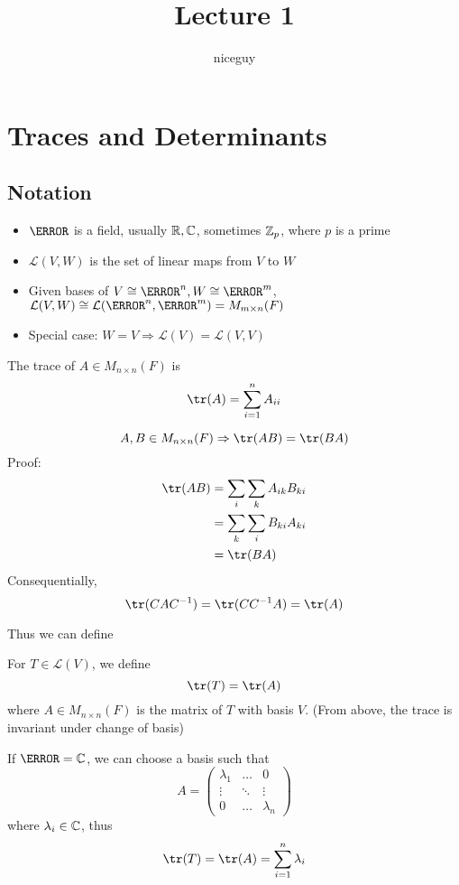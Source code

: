 \documentclass[12pt]{article}
\author{niceguy}
\title{Lecture 1}
\begin{document}
\maketitle

\section{Traces and Determinants}

\subsection{Notation}

\begin{itemize}
	\item $\F$ is a field, usually $\mathbb{R}, \mathbb{C}$, sometimes $\mathbb{Z}_p$, where $p$ is a prime
	\item $\mathcal{L}(V,W)$ is the set of linear maps from $V$ to $W$
	\item Given bases of $V \cong \F^n, W \cong \F^m$, $\mathcal{L}(V,W) \cong \mathcal{L}(\F^n, \F^m) = M_{m\times n}(F)$
	\item Special case: $W=V \Rightarrow \mathcal{L}(V) = \mathcal{L}(V,V)$
\end{itemize}

\begin{defn}
	The trace of $A \in M_{n\times n}(F)$ is
	$$\tr(A) = \sum_{i=1}^n A_{ii}$$
\end{defn}

\begin{lem}
	$$A, B \in M_{n\times n}(F) \Rightarrow \tr(AB) = \tr(BA)$$
	Proof:
	\begin{align*}
		\tr(AB) &= \sum_i \sum_k A_{ik}B_{ki} \\
			&= \sum_k \sum_i B_{ki}A_{ki} \\
			&= \tr(BA)
	\end{align*}
	Consequentially,
	$$\tr(CAC^{-1}) = \tr(CC^{-1}A) = \tr(A)$$
\end{lem}

Thus we can define

\begin{defn}
	For $T \in \mathcal{L}(V)$, we define
	$$\tr(T) = \tr(A)$$
	where $A \in M_{n\times n}(F)$ is the matrix of $T$ with basis $V$. (From above, the trace is invariant under change of basis)
\end{defn}

\begin{remember}
	If $\F = \C$, we can choose a basis such that
	$$A = \begin{pmatrix} \lambda_1 & \dots & 0 \\ \vdots & \ddots & \vdots \\ 0 & \dots & \lambda_n \end{pmatrix}$$
	where $\lambda_i \in \mathbb{C}$, thus
	$$\tr(T) = \tr(A) = \sum_{i=1}^n \lambda_i$$
\end{remember}
\end{document}
